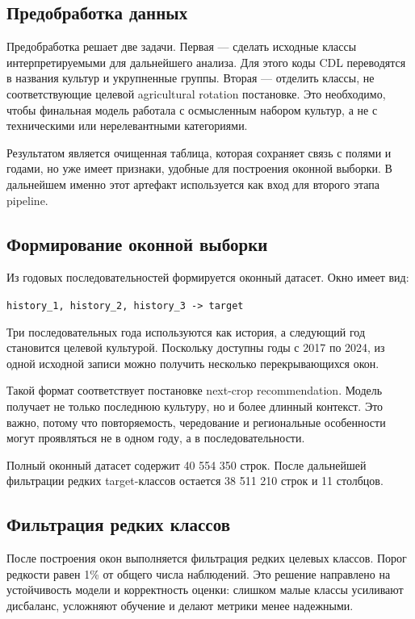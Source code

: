 \documentclass[a4paper,article,14pt]{extarticle}
\begin{document}
\subsection{Предобработка данных}

Предобработка решает две задачи. Первая --- сделать исходные классы интерпретируемыми для дальнейшего анализа. Для этого коды CDL переводятся в названия культур и укрупненные группы. Вторая --- отделить классы, не соответствующие целевой agricultural rotation постановке. Это необходимо, чтобы финальная модель работала с осмысленным набором культур, а не с техническими или нерелевантными категориями.

Результатом является очищенная таблица, которая сохраняет связь с полями и годами, но уже имеет признаки, удобные для построения оконной выборки. В дальнейшем именно этот артефакт используется как вход для второго этапа pipeline.

\subsection{Формирование оконной выборки}

Из годовых последовательностей формируется оконный датасет. Окно имеет вид:
\begin{center}
\texttt{history\_1, history\_2, history\_3 -> target}
\end{center}
Три последовательных года используются как история, а следующий год становится целевой культурой. Поскольку доступны годы с 2017 по 2024, из одной исходной записи можно получить несколько перекрывающихся окон.

Такой формат соответствует постановке next-crop recommendation. Модель получает не только последнюю культуру, но и более длинный контекст. Это важно, потому что повторяемость, чередование и региональные особенности могут проявляться не в одном году, а в последовательности.

Полный оконный датасет содержит 40 554 350 строк. После дальнейшей фильтрации редких target-классов остается 38 511 210 строк и 11 столбцов.

\subsection{Фильтрация редких классов}

После построения окон выполняется фильтрация редких целевых классов. Порог редкости равен 1\% от общего числа наблюдений. Это решение направлено на устойчивость модели и корректность оценки: слишком малые классы усиливают дисбаланс, усложняют обучение и делают метрики менее надежными.
\end{document}
